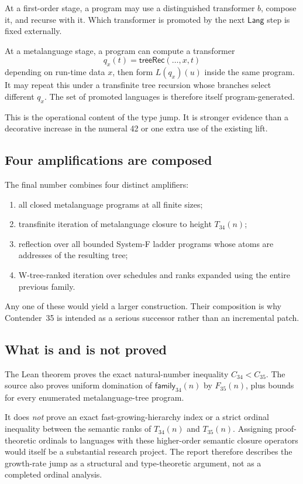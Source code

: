 \documentclass[11pt]{article}
\theoremstyle{definition}
\newcommand{\Lang}{\mathsf{Lang}}
\begin{document}
At a first-order stage, a program may use a distinguished transformer \(b\),
compose it, and recurse with it.  Which transformer is promoted by the next
\(\Lang\) step is fixed externally.

At a metalanguage stage, a program can compute a transformer
\[
  q_x(t)=\mathsf{treeRec}(\ldots,x,t)
\]
depending on run-time data \(x\), then form \(L(q_x)(u)\) inside the same
program.  It may repeat this under a transfinite tree recursion whose branches
select different \(q_x\).  The set of promoted languages is therefore itself
program-generated.

This is the operational content of the type jump.  It is stronger evidence
than a decorative increase in the numeral 42 or one extra use of the existing
lift.

\subsection{Four amplifications are composed}

The final number combines four distinct amplifiers:
\begin{enumerate}[leftmargin=2.3em]
  \item all closed metalanguage programs at all finite sizes;
  \item transfinite iteration of metalanguage closure to height
  \(T_{34}(n)\);
  \item reflection over all bounded System-F ladder programs whose atoms are
  addresses of the resulting tree;
  \item W-tree-ranked iteration over schedules and ranks expanded using the
  entire previous family.
\end{enumerate}
Any one of these would yield a larger construction.  Their composition is why
Contender~35 is intended as a serious successor rather than an incremental
patch.

\subsection{What is and is not proved}

The Lean theorem proves the exact natural-number inequality
\(C_{34}<C_{35}\).  The source also proves uniform domination of
\(\mathsf{family}_{34}(n)\) by \(F_{35}(n)\), plus bounds for every enumerated
metalanguage-tree program.

It does \emph{not} prove an exact fast-growing-hierarchy index or a strict
ordinal inequality between the semantic ranks of \(T_{34}(n)\) and
\(T_{35}(n)\).  Assigning proof-theoretic ordinals to languages with these
higher-order semantic closure operators would itself be a substantial research
project.  The report therefore describes the growth-rate jump as a structural
and type-theoretic argument, not as a completed ordinal analysis.
\end{document}
